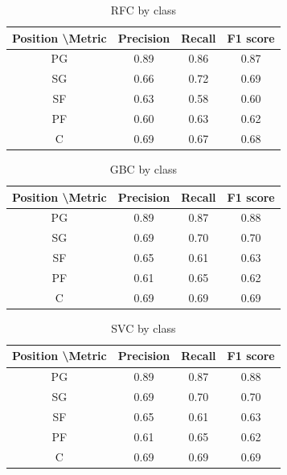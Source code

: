 \documentclass[a4paper]{article}
\begin{document}
\begin{table}[!h]
\begin{center}
\begin{tabular}{|c|c|c|c|} \hline
Position \textbackslash Metric & Precision & Recall & F1 score \\ \hline
PG & 0.89 & 0.86 & 0.87 \\ \hline
SG & 0.66 & 0.72 & 0.69 \\ \hline
SF & 0.63 & 0.58 & 0.60 \\ \hline
PF & 0.60 & 0.63 & 0.62 \\ \hline
C & 0.69 & 0.67 & 0.68 \\ \hline
\end{tabular}
\caption{RFC by class}
\label{tab:pos_clf_rfc}
\end{center}
\end{table}

\begin{table}[!h]
\begin{center}
\begin{tabular}{|c|c|c|c|} \hline
Position \textbackslash Metric & Precision & Recall & F1 score \\ \hline
PG & 0.89 & 0.87 & 0.88 \\ \hline
SG & 0.69 & 0.70 & 0.70 \\ \hline
SF & 0.65 & 0.61 & 0.63 \\ \hline
PF & 0.61 & 0.65 & 0.62 \\ \hline
C & 0.69 & 0.69 & 0.69 \\ \hline
\end{tabular}
\caption{GBC by class}
\label{tab:pos_clf_gbc}
\end{center}
\end{table}

\begin{table}[!h]
\begin{center}
\begin{tabular}{|c|c|c|c|} \hline
Position \textbackslash Metric & Precision & Recall & F1 score \\ \hline
PG & 0.89 & 0.87 & 0.88 \\ \hline
SG & 0.69 & 0.70 & 0.70 \\ \hline
SF & 0.65 & 0.61 & 0.63 \\ \hline
PF & 0.61 & 0.65 & 0.62 \\ \hline
C & 0.69 & 0.69 & 0.69 \\ \hline
\end{tabular}
\caption{SVC by class}
\label{tab:pos_clf_svc}
\end{center}
\end{table}
\end{document}
